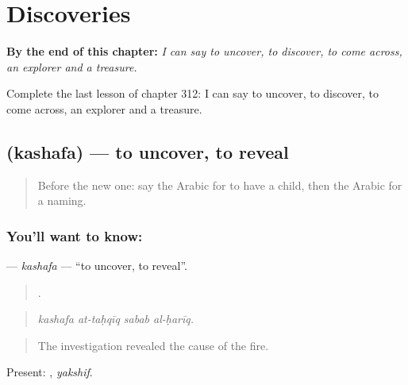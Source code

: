 
\chapter{Discoveries}
\label{ch:ar-discoveries}

\begin{chapteropening}
\textbf{By the end of this chapter:} \emph{I can say to uncover, to discover, to come across, an explorer and a treasure.}

Complete the last lesson of chapter 312: I can say to uncover, to discover, to come across, an explorer and a treasure.
\end{chapteropening}

\section[\texorpdfstring{\ar{كشف} (kashafa)}{كشف (kashafa)}]{ (kashafa) — to uncover, to reveal}

\label{lesson:AR-C312-kashafa}



\begin{quote}
Before the new one: say the Arabic for to have a child, then the Arabic for a naming.
\end{quote}

\subsection*{You'll want to know: }
\textbf{} — \emph{kashafa} — \textquotedblleft{}to uncover, to reveal\textquotedblright{}.

\begin{quote}
   .
\end{quote}

\begin{quote}
\emph{kashafa at-taḥqīq sabab al-ḥarīq.}
\end{quote}

\begin{quote}
The investigation revealed the cause of the fire.
\end{quote}

Present: , \emph{yakshif}.

